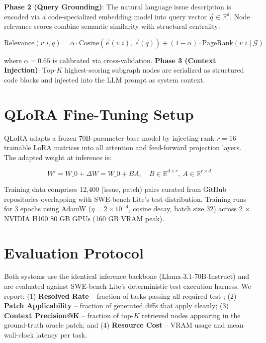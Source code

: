 \documentclass[10pt,twocolumn,letterpaper]{article}
\begin{document}
\textbf{Phase 2 (Query Grounding)}: The natural language issue description is encoded via a code-specialized embedding model into query vector $\vec{q} \in \mathbb{R}^d$. Node relevance scores combine semantic similarity with structural centrality:

\begin{equation}
\text{Relevance}(v\_i, q) = \alpha \cdot \text{Cosine}\!\left(\vec{e}(v\_i),\, \vec{e}(q)\right) + (1-\alpha) \cdot \text{PageRank}(v\_i \mid \mathcal{G})
\end{equation}

where $\alpha = 0.65$ is calibrated via cross-validation. \textbf{Phase 3 (Context Injection)}: Top-$K$ highest-scoring subgraph nodes are serialized as structured code blocks and injected into the LLM prompt as system context.


\section{QLoRA Fine-Tuning Setup}


QLoRA adapts a frozen 70B-parameter base model by injecting rank-$r = 16$ trainable LoRA matrices into all attention and feed-forward projection layers. The adapted weight at inference is:

\begin{equation}
W' = W\_0 + \Delta W = W\_0 + BA, \quad B \in \mathbb{R}^{d \times r},\ A \in \mathbb{R}^{r \times d}
\end{equation}

Training data comprises 12,400 (issue, patch) pairs curated from GitHub repositories overlapping with SWE-bench Lite's test distribution. Training runs for 3 epochs using AdamW ($\eta = 2 \times 10^{-4}$, cosine decay, batch size 32) across 2 $\times$ NVIDIA H100 80 GB GPUs (160 GB VRAM peak).


\section{Evaluation Protocol}


Both systems use the identical inference backbone (Llama-3.1-70B-Instruct) and are evaluated against SWE-bench Lite's deterministic test execution harness. We report: (1) \textbf{Resolved Rate} -- fraction of tasks passing all required test \cases; (2) \textbf{Patch Applicability} -- fraction of generated diffs that apply cleanly; (3) \textbf{Context Precision@K} -- fraction of top-$K$ retrieved nodes appearing in the ground-truth oracle patch; and (4) \textbf{Resource Cost} -- VRAM usage and mean wall-clock latency per task.
\end{document}
